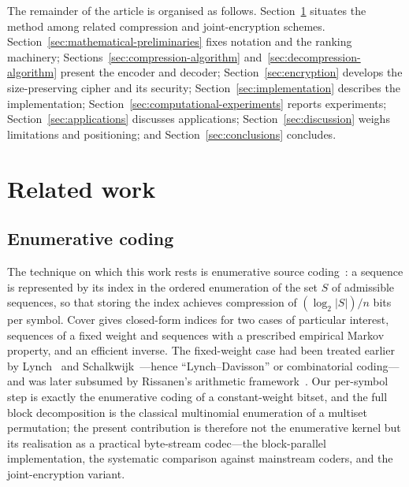 \documentclass[entropy,article,submit,oneauthor,pdftex]{Definitions/mdpi}
\begin{document}
The remainder of the article is organised as follows.
Section~\ref{sec:related-work} situates the method among related compression and
joint-encryption schemes. Section~\ref{sec:mathematical-preliminaries} fixes
notation and the ranking machinery; Sections~\ref{sec:compression-algorithm}
and~\ref{sec:decompression-algorithm} present the encoder and decoder;
Section~\ref{sec:encryption} develops the size-preserving cipher and its security;
Section~\ref{sec:implementation} describes the implementation;
Section~\ref{sec:computational-experiments} reports experiments;
Section~\ref{sec:applications} discusses applications;
Section~\ref{sec:discussion} weighs limitations and positioning; and
Section~\ref{sec:conclusions} concludes.
\section{Related work}\label{sec:related-work}
\subsection{Enumerative coding}
The technique on which this work rests is enumerative source
coding~\cite{cover1973enumerative}: a sequence is represented by its index in the
ordered enumeration of the set $S$ of admissible sequences, so that storing the index
achieves compression of $(\log_2|S|)/n$ bits per symbol. Cover gives closed-form
indices for two cases of particular interest, sequences of a fixed weight and
sequences with a prescribed empirical Markov property, and an efficient inverse.
The fixed-weight case had been treated earlier by
Lynch~\cite{lynch1966} and Schalkwijk~\cite{schalkwijk1972}---hence
``Lynch--Davisson'' or combinatorial coding---and was later subsumed by
Rissanen's arithmetic framework~\cite{rissanen1976}. Our per-symbol step is
exactly the enumerative coding of a constant-weight bitset, and the full block
decomposition is the classical multinomial enumeration of a multiset permutation;
the present contribution is therefore not the enumerative kernel but its realisation
as a practical byte-stream codec---the block-parallel implementation, the systematic
comparison against mainstream coders, and the joint-encryption variant.
\end{document}
